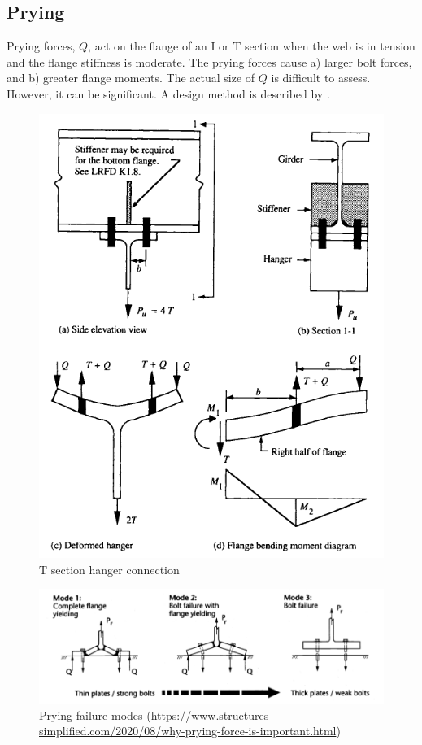 \subsection{Prying}
Prying forces, $Q$, act on the flange of an I or T section when the web is in tension and the flange stiffness is moderate. The prying forces cause a) larger bolt forces, and b) greater flange moments. The actual size of $Q$ is difficult to assess. However, it can be significant. A design method is described by \citet{Salmon2009}.
\begin{figure}[H]
\centering
\includegraphics[scale=1]{PIC/CH06/PRY3}
\caption{T section hanger connection \citep{Smith1996}}
\end{figure}
\begin{figure}[H]
\centering
\includegraphics[width=14cm]{PIC/CH06/PRY}
\caption{Prying failure modes (\href{https://www.structures-simplified.com/2020/08/why-prying-force-is-important.html}{\url{https://www.structures-simplified.com/2020/08/why-prying-force-is-important.html}})}
\end{figure}

